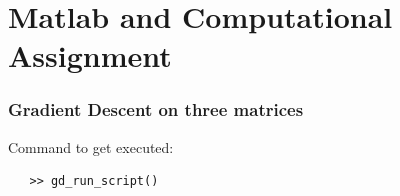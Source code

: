 \documentclass[11pt,a4paper]{article}
\begin{document}
\begin{titlepage}
    \maketitle
\end{titlepage}
\renewcommand{\contentsname}{Table of Contents}
\begin{center} 
    \tableofcontents 
    \listoffigures
\end{center}
\newpage

\part{Matlab and Computational Assignment}
\section{Gradient Descent on three matrices}
Command to get executed: 
\begin{verbatim}
   >> gd_run_script()
\end{verbatim}
\end{document}
